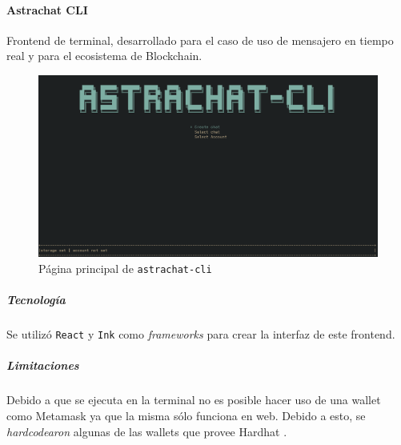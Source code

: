 \paragraph{Astrachat CLI}

Frontend de terminal, desarrollado para el caso de uso de mensajero en tiempo real y para el ecosistema de Blockchain.

\begin{figure}[H]
    \centering
    \includegraphics[width=1\linewidth]{img/astrachat-cli-main-page.png}
    \caption{Página principal de \texttt{astrachat-cli}}
    \label{fig:astrachat-cli-main-page}
\end{figure}

\subparagraph{Tecnología}

Se utilizó \texttt{React} \cite{react} y \texttt{Ink} \cite{ink} como \textit{frameworks} para crear la interfaz de este frontend.

\subparagraph{Limitaciones}

Debido a que se ejecuta en la terminal no es posible hacer uso de una wallet como Metamask \cite{metamask} ya que la misma sólo funciona en web. Debido a esto, se \textit{hardcodearon} algunas de las wallets que provee Hardhat \cite{hardhat}.